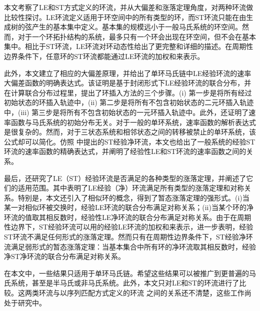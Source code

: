 本文考察了LE和ST方式定义的环流，并从大偏差和涨落定理角度，对两种环流做比较性探讨。LE环流定义适用于环空间中的所有类型的环，而ST环流只能在由生成树的弦产生的基本集中定义。基本集的规模远小于一般马氏系统的环空间。然而，对于一个环拓扑结构的系统，最多只有一个环会出现在环空间，但不会在基本集中。相比于ST环流，LE环流对环动态性给出了更完整和详细的描述。在周期性边界条件下，任意环的ST环流都能通过LE环流的加权和来表示。

此外，本文建立了相应的大偏差原理，并给出了单环马氏链中LE经验环流的速率大偏差函数的明确表达式。该证明是基于封闭形式下LE经验环流的联合分布，并在计算联合分布过程里，提出了环插入方法的三个步骤。(i) 第一步是将所有经过初始状态的环插入轨迹中，(ii) 第二步是将所有不包含初始状态的二元环插入轨迹中，(iii) 第三步是将所有不包含初始状态的一元环插入轨迹中。此外，还证明了速率函数与马氏系统的初始分布无关。对于一般的单环系统，速率函数的解析表达式是很复杂的。然而，对于三状态系统和相邻状态之间的转移被禁止的单环系统，该公式却可以简化。仿照 \cite{bertini2015flows} 中提出的ST经验净环流，本文也给出了一般系统的经验ST环流的速率函数的精确表达式，并阐明了经验性LE和ST环流的速率函数之间的关系。

最后，还研究了LE（ST）经验环流是否满足的各种类型的涨落定理，并阐述了它们的适用范围。其中表明了LE经验（净）环流满足所有类型的涨落定理和对称关系。特别是，本文还引入了相似环的概念，得到了暂态涨落定理的强形式。(i)当某一对相似环被交换时，经验LE环流的联合分布满足对称关系；(ii)当某个环的净环流的值取其相反数时，经验性LE净环流的联合分布满足对称关系。由于在周期性边界下，ST经验环流可以用的经验LE环流的加权和来表示，进一步表明，经验ST环流不满足任何形式的涨落定理。然而只有在周期性边界条件下，ST经验净环流满足弱形式的暂态涨落定理：当基本集合中所有环的净环流取其相反数时，经验净ST净环流的联合分布满足对称关系。

在本文中，一些结果只适用于单环马氏链。希望这些结果可以被推广到更普遍的马氏系统，甚至是半马氏或非马氏系统。此外，本文只对LE和ST的环流进行了比较。这两类环流与以序列匹配方式定义的环流 \cite{roldan2019exact,biddle2020reversal,pietzonka2021cycle} 之间的关系还不清楚，这些工作尚处于研究中。